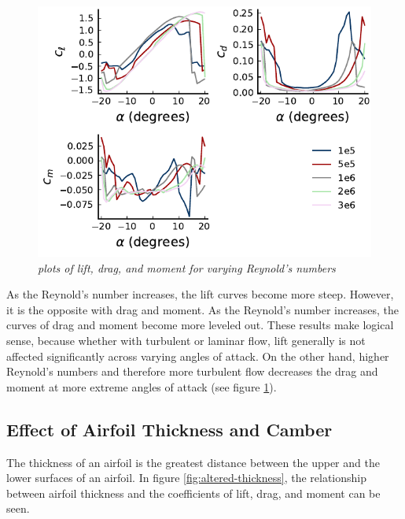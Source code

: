 \documentclass{journal}
\begin{document}
	\begin{figure}
		\centering
		\includegraphics{../graphics/altered-reynolds.pdf}
		\caption{\emph{plots of lift, drag, and moment for varying Reynold's numbers}}
		\label{fig:altered-reynolds}
	\end{figure}
	
	As the Reynold's number increases, the lift curves become more steep. However, it is the opposite with drag and moment. As the Reynold's number increases, the curves of drag and moment become more leveled out. These results make logical sense, because whether with turbulent or laminar flow, lift generally is not affected significantly across varying angles of attack. On the other hand, higher Reynold's numbers and therefore more turbulent flow decreases the drag and moment at more extreme angles of attack (see figure \ref{fig:altered-reynolds}).
	
	\subsection{Effect of Airfoil Thickness and Camber}
	The thickness of an airfoil is the greatest distance between the upper and the lower surfaces of an airfoil. In figure \ref{fig:altered-thickness}, the relationship between airfoil thickness and the coefficients of lift, drag, and moment can be seen.
	
\end{document}

